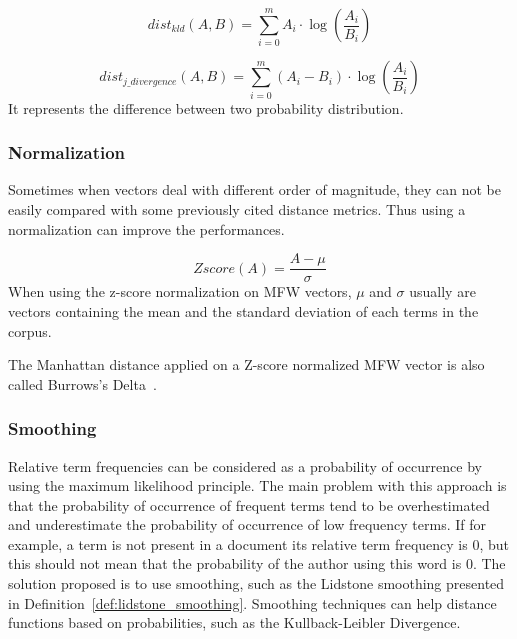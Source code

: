 \begin{definition}
  \begin{equation}
    dist_{kld}(A, B) = \sum_{i=0}^{m} A_i \cdot \log(\frac{A_i}{B_i})
  \end{equation}
\end{definition}

\begin{definition}
  \begin{equation}
    dist_{j\_divergence}(A, B) = \sum_{i=0}^{m} (A_i - B_i) \cdot \log(\frac{A_i}{B_i})
  \end{equation}
  It represents the difference between two probability distribution.
\end{definition}


\subsubsection{Normalization}

Sometimes when vectors deal with different order of magnitude, they can not be easily compared with some previously cited distance metrics.
Thus using a normalization can improve the performances.

\begin{definition}
  \label{def:z_score}
  \begin{equation}
    Zscore(A) = \frac{A - \mu}{\sigma}
  \end{equation}
  When using the z-score normalization on MFW vectors, $\mu$ and $\sigma$ usually are vectors containing the mean and the standard deviation of each terms in the corpus.
\end{definition}

The Manhattan distance applied on a Z-score normalized MFW vector is also called Burrows's Delta~\cite{savoy_stylo}.

\subsubsection{Smoothing}

Relative term frequencies can be considered as a probability of occurrence by using the maximum likelihood principle.
The main problem with this approach is that the probability of occurrence of frequent terms tend to be overhestimated and underestimate the probability of occurrence of low frequency terms.
If for example, a term is not present in a document its relative term frequency is 0, but this should not mean that the probability of the author using this word is 0.
The solution proposed is to use smoothing, such as the Lidstone smoothing presented in Definition~\ref{def:lidstone_smoothing}.
Smoothing techniques can help distance functions based on probabilities, such as the Kullback-Leibler Divergence.~\cite{savoy_stylo}

